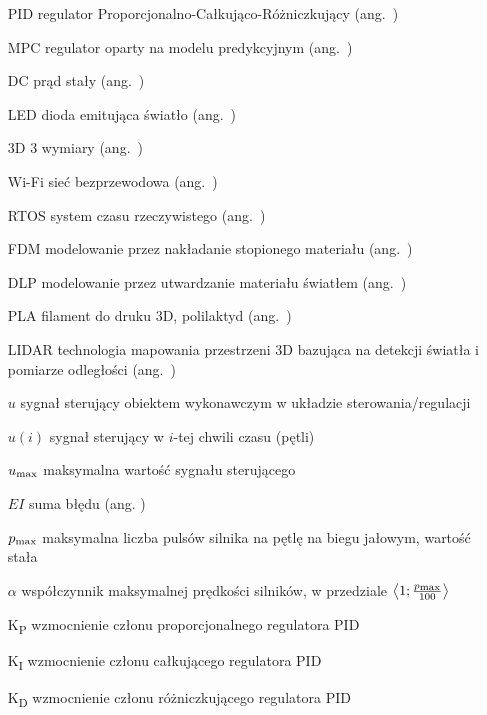 \begin{itemize}
\item[PID] regulator Proporcjonalno-Całkująco-Różniczkujący (ang.~)
\item[MPC] regulator oparty na modelu predykcyjnym (ang.~)
\item[DC] prąd stały (ang.~)
\item[LED] dioda emitująca światło (ang.~)
\item[3D] 3 wymiary (ang.~)
\item[Wi-Fi] sieć bezprzewodowa (ang.~)
\item[RTOS] system czasu rzeczywistego (ang.~)
\item[FDM] modelowanie przez nakładanie stopionego materiału (ang.~)
\item[DLP] modelowanie przez utwardzanie materiału światłem (ang.~)
\item[PLA] filament do druku 3D, polilaktyd (ang.~)
\item[LIDAR] technologia mapowania przestrzeni 3D bazująca na detekcji światła i pomiarze odległości (ang.~)
\item[$u$] sygnał sterujący obiektem wykonawczym w układzie sterowania/regulacji
\item[$u(i)$] sygnał sterujący w $i$-tej chwili czasu (pętli)
\item[$u\textsubscript{max}$] maksymalna wartość sygnału sterującego
\item[$EI$] suma błędu (ang. )
\item[$p\textsubscript{max}$] maksymalna liczba pulsów silnika na pętlę na biegu jałowym, wartość stała
\item[$\alpha$] współczynnik maksymalnej prędkości silników, w przedziale $\left<1; \frac{p\textsubscript{max}}{100}\right>$ 
\item[K\textsubscript{P}] wzmocnienie członu proporcjonalnego regulatora PID
\item[K\textsubscript{I}] wzmocnienie członu całkującego regulatora PID
\item[K\textsubscript{D}] wzmocnienie członu różniczkującego regulatora PID
\end{itemize}